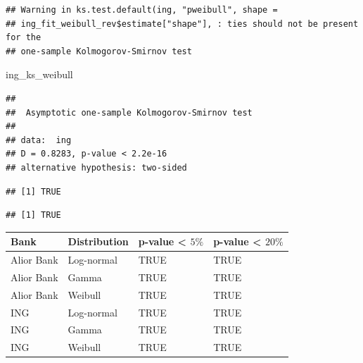 \documentclass[
]{article}
\newenvironment{Shaded}{\begin{snugshade}}{\end{snugshade}}
\newcommand{\FloatTok}[1]{\textcolor[rgb]{0.00,0.00,0.81}{#1}}
\newcommand{\NormalTok}[1]{#1}
\newcommand{\SpecialCharTok}[1]{\textcolor[rgb]{0.81,0.36,0.00}{\textbf{#1}}}
\begin{document}
\begin{verbatim}
## Warning in ks.test.default(ing, "pweibull", shape =
## ing_fit_weibull_rev$estimate["shape"], : ties should not be present for the
## one-sample Kolmogorov-Smirnov test
\end{verbatim}

\begin{Shaded}
\begin{Highlighting}[]
\NormalTok{ing\_ks\_weibull}
\end{Highlighting}
\end{Shaded}

\begin{verbatim}
## 
##  Asymptotic one-sample Kolmogorov-Smirnov test
## 
## data:  ing
## D = 0.8283, p-value < 2.2e-16
## alternative hypothesis: two-sided
\end{verbatim}

\begin{Shaded}
\end{Shaded}

\begin{verbatim}
## [1] TRUE
\end{verbatim}

\begin{Shaded}
\end{Shaded}

\begin{verbatim}
## [1] TRUE
\end{verbatim}

\begin{longtable}[]{@{}llll@{}}
\toprule\noalign{}
Bank & Distribution & p-value \textless{} \(5\%\) & p-value \textless{}
\(20\%\) \\
\midrule\noalign{}
\endhead
\bottomrule\noalign{}
\endlastfoot
Alior Bank & Log-normal & TRUE & TRUE \\
Alior Bank & Gamma & TRUE & TRUE \\
Alior Bank & Weibull & TRUE & TRUE \\
ING & Log-normal & TRUE & TRUE \\
ING & Gamma & TRUE & TRUE \\
ING & Weibull & TRUE & TRUE \\
\end{longtable}
\end{document}

